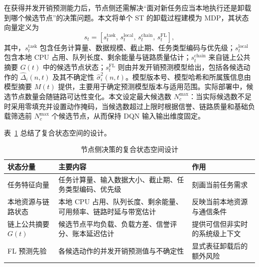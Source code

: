 在获得并发开销预测能力后，节点侧还需解决“面对新任务应当本地执行还是卸载到哪个候选节点”的决策问题。本文将单个 ST 的卸载过程建模为 MDP，其状态向量定义为
\begin{equation}
    s_t =
    \left[
        s_t^{\mathrm{task}},\,
        s_t^{\mathrm{local}},\,
        s_t^{\mathrm{chain}},\,
        s_t^{\mathrm{FL}}
        \right],
    \label{eq:ch5_dqn_state}
\end{equation}
其中，$s_t^{\mathrm{task}}$ 包含任务计算量、数据规模、截止期、任务类型编码与优先级；$s_t^{\mathrm{local}}$ 包含本地 CPU 占用、队列长度、剩余能量与链路质量估计；$s_t^{\mathrm{chain}}$ 来自链上公共摘要 $G(t)$ 中的候选节点状态；$s_t^{\mathrm{FL}}$ 则由并发开销预测模型给出，包括各候选动作的 $\widehat{\Delta}_i(n,t)$ 及其不确定性 $\widehat{\sigma}_i^2(n,t)$。模型版本号、模型哈希和所属簇信息由模型摘要 $M(t)$ 提供，主要用于确定预测模型版本与适用范围。实际部署中，候选节点数量会随链路可达性变化。本文设定最大候选数 $N_c^{\max}$：当实际候选数不足时采用零填充并设置动作掩码，当候选数超过上限时根据信誉、链路质量和基础负载筛选前 $N_c^{\max}$ 个候选节点，从而保持 DQN 输入输出维度固定。

表~\ref{tab:ch5_state_space} 总结了复合状态空间的设计。

\begin{table}[H]
    \centering
    \caption{节点侧决策的复合状态空间设计}
    \label{tab:ch5_state_space}
    \begin{tabular}{p{3.1cm}p{5.8cm}p{3.0cm}}
        \toprule
        状态分量          & 主要内容                               & 作用              \\
        \midrule
        任务特征向量        & 任务计算量、输入数据大小、截止期、任务类型编码、优先级        & 刻画当前任务需求        \\
        本地资源与链路状态     & 本地 CPU 占用、队列长度、剩余能量、可用频率、链路时延与带宽估计 & 反映当前本地资源与通信条件   \\
        链上公共摘要 $G(t)$ & 候选节点平均负载、负载方差、信誉评分、账本延迟估计          & 提供可信但非实时的系统级上下文 \\
        FL 预测先验       & 各候选动作的并发开销预测值与不确定性                 & 显式表征卸载后的额外风险    \\
        \bottomrule
    \end{tabular}
\end{table}

